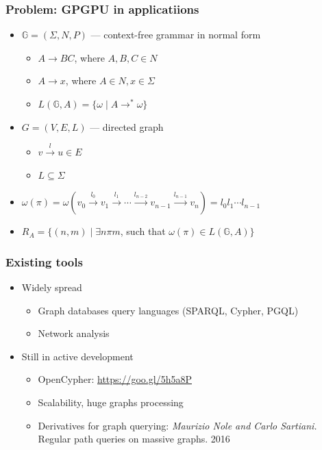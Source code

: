 \documentclass[xcolor=table]{beamer}
\begin{document}
\begin{frame}[fragile]
  \transwipe[direction=90]
  \frametitle{Problem: GPGPU in applicatiions}
  \begin{itemize}
    \item $\mathbb{G} = (\Sigma, N, P)$ --- context-free grammar in normal form
    \begin{itemize}
      \item $A \rightarrow B C$, where $A, B, C \in N$
      \item $A \rightarrow x$, where $A \in N, x \in \Sigma$
      \item $L(\mathbb{G},A) = \{ \omega \mid A \rightarrow^* \omega \}$
    \end{itemize}
    \item $G = (V,E,L)$ --- directed graph
      \begin{itemize} 
        \item $v \xrightarrow{l} u \in E$
        \item $L \subseteq \Sigma$
      \end{itemize}
    \item $\omega(\pi) = \omega(v_0 \xrightarrow{l_0} v_1 \xrightarrow{l_1} \cdots \xrightarrow{l_{n-2}} v_{n-1} \xrightarrow{l_{n-1}} v_n) = l_0 l_1 \cdots l_{n-1}$
    \item $R_A = \{ (n, m) \mid \exists n \pi m$, such that $\omega(\pi) \in L(\mathbb{G},A)\}$
  \end{itemize}
\end{frame}

\begin{frame}[fragile]
  \transwipe[direction=90]
  \frametitle{Existing tools}
  \begin{itemize}
   \item Widely spread
    \begin{itemize}
      \item Graph databases query languages (SPARQL, Cypher, PGQL)
      \item Network analysis
    \end{itemize}  
    \item Still in active development
    \begin{itemize}
      \item OpenCypher: \url{https://goo.gl/5h5a8P}
      \item Scalability, huge graphs processing
      \item Derivatives for graph querying: \emph{Maurizio Nole and Carlo Sartiani.} Regular path queries on massive graphs. 2016
    \end{itemize}   
  \end{itemize}
\end{frame}
\end{document}
